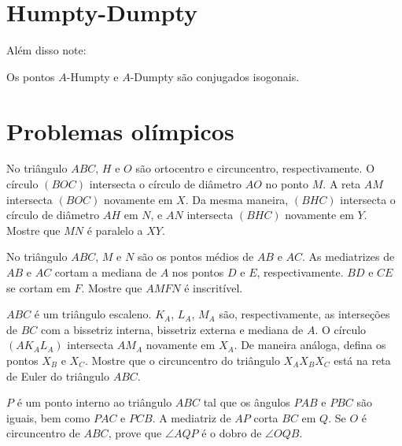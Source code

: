 \documentclass[10pt, a4paper]{article}
\begin{document}
	\section{Humpty-Dumpty}
	
	Além disso note:
	\begin{prop}
		Os pontos $A$-Humpty e $A$-Dumpty são conjugados isogonais.
	\end{prop}

	\section{Problemas olímpicos}
	\begin{prob}[ELMO 2014]
		No triângulo $ABC$, $H$ e $O$ são ortocentro e circuncentro, respectivamente.
		O círculo $(BOC)$ intersecta o círculo de diâmetro $AO$ no ponto $M$.
		A reta $AM$ intersecta $(BOC)$ novamente em $X$.
		Da mesma maneira, $(BHC)$ intersecta o círculo de diâmetro $AH$ em $N$, e $AN$ intersecta $(BHC)$ novamente em $Y$.
		Mostre que $MN$ é paralelo a $XY$.
	\end{prob}
	\begin{prob}[USAMO 2008]
		No triângulo $ABC$, $M$ e $N$ são os pontos médios de $AB$ e $AC$.
		As mediatrizes de $AB$ e $AC$ cortam a mediana de $A$ nos pontos $D$ e $E$, respectivamente.
		$BD$ e $CE$ se cortam em $F$.
		Mostre que $AMFN$ é inscritível.
	\end{prob}
	\begin{prob}
		$ABC$ é um triângulo escaleno. $K_A$, $L_A$, $M_A$ são, respectivamente, as interseções de $BC$ com a bissetriz interna, bissetriz externa e mediana de $A$. O círculo $(AK_AL_A)$ intersecta $AM_A$ novamente em $X_A$. De maneira análoga, defina os pontos $X_B$ e $X_C$. Mostre que o circuncentro do triângulo $X_AX_BX_C$ está na reta de Euler do triângulo $ABC$.
	\end{prob}
	\begin{prob}
		$P$ é um ponto interno ao triângulo $ABC$ tal que os ângulos $PAB$ e $PBC$ são iguais, bem como $PAC$ e $PCB$. A mediatriz de $AP$ corta $BC$ em $Q$. Se $O$ é circuncentro de $ABC$, prove que $\angle AQP$ é o dobro de $\angle OQB$.
	\end{prob}
\end{document}
